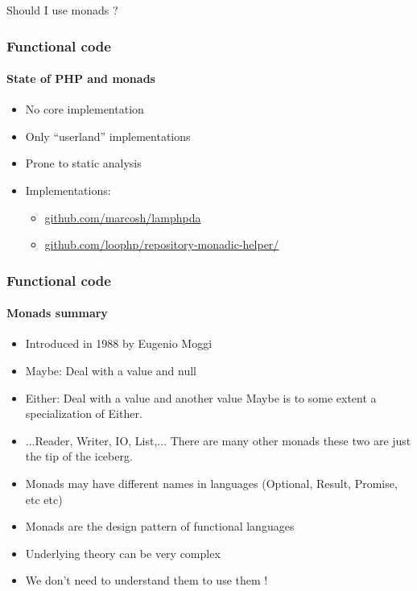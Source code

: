 \begin{frame}
    \centering
    \Huge Should I use monads ?

\end{frame}

\begin{frame}
    \frametitle{Functional code}
    \framesubtitle{State of PHP and monads}

    \begin{itemize}[<+->]
        \item No core implementation
        \item Only ``userland'' implementations
        \item Prone to static analysis
        \item Implementations:
            \begin{itemize}[<+->]
                \item \href{https://github.com/marcosh/lamphpda}{github.com/marcosh/lamphpda}
                \item \href{https://github.com/loophp/repository-monadic-helper/}{github.com/loophp/repository-monadic-helper/}
            \end{itemize}
    \end{itemize}
\end{frame}

\begin{frame}
    \frametitle{Functional code}
    \framesubtitle{Monads summary}

    \begin{itemize}
        \item Introduced in 1988 by Eugenio Moggi
        \item Maybe: Deal with a value and null
        \item Either: Deal with a value and another value
            Maybe is to some extent a specialization of Either.
        \item ...Reader, Writer, IO, List,... There are many other monads these
            two are just the tip of the iceberg.
        \item Monads may have different names in languages (Optional, Result, Promise, etc etc)
        \item Monads are the design pattern of functional languages
        \item Underlying theory can be very complex
        \item We don't need to understand them to use them !
    \end{itemize}
\end{frame}

